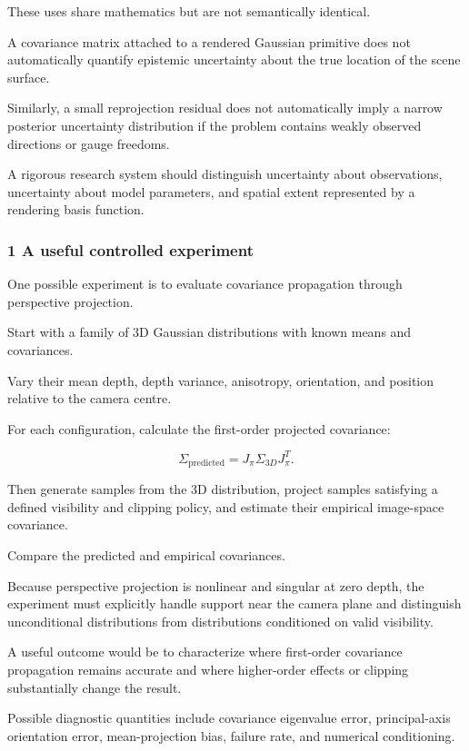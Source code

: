 These uses share mathematics but are not semantically identical.

A covariance matrix attached to a rendered Gaussian primitive does not automatically quantify epistemic uncertainty about the true location of the scene surface.

Similarly, a small reprojection residual does not automatically imply a narrow posterior uncertainty distribution if the problem contains weakly observed directions or gauge freedoms.

A rigorous research system should distinguish uncertainty about observations, uncertainty about model parameters, and spatial extent represented by a rendering basis function.

\subsubsection{1 A useful controlled experiment}\label{02-foundations-ii-ch031-a-useful-controlled-experiment}

One possible experiment is to evaluate covariance propagation through perspective projection.

Start with a family of 3D Gaussian distributions with known means and covariances.

Vary their mean depth, depth variance, anisotropy, orientation, and position relative to the camera centre.

For each configuration, calculate the first-order projected covariance:

\[
 \Sigma_{\mathrm{predicted}} = J_\pi\Sigma_{3D}J_\pi^T.
\]

Then generate samples from the 3D distribution, project samples satisfying a defined visibility and clipping policy, and estimate their empirical image-space covariance.

Compare the predicted and empirical covariances.

Because perspective projection is nonlinear and singular at zero depth, the experiment must explicitly handle support near the camera plane and distinguish unconditional distributions from distributions conditioned on valid visibility.

A useful outcome would be to characterize where first-order covariance propagation remains accurate and where higher-order effects or clipping substantially change the result.

Possible diagnostic quantities include covariance eigenvalue error, principal-axis orientation error, mean-projection bias, failure rate, and numerical conditioning.

